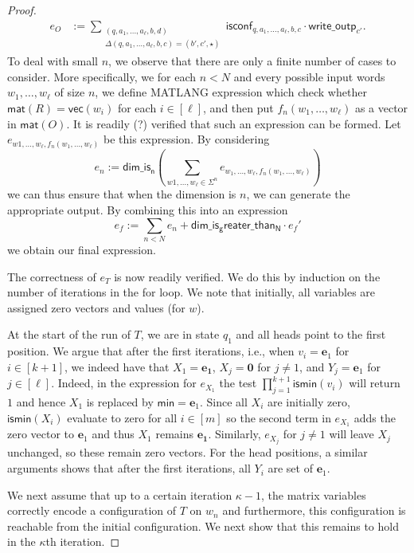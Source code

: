 \begin{proof}
\begin{align*}
	e_{O}&:=\sum_{\substack{(q,a_1,\ldots,a_\ell,b,d)\\
	\Delta(q,a_1,\ldots,a_\ell,b,c)=(b',c',\star)}}\!\!\!\!\!\!\!\!\! \mathsf{isconf}_{q,a_1,\ldots,a_\ell,b,c}\cdot\mathsf{write\_outp}_{c'}.
\end{align*}
To deal with small $n$, we observe that there are only a finite number of cases to
consider. More specifically, we for each $n<N$ and every possible input words
$w_1,\ldots,w_\ell$ of size $n$, we define MATLANG expression which check whether
$\mathsf{mat}(R)=\mathsf{vec}(w_i)$ for each $i\in[\ell]$, and then put $f_n(w_1,\ldots,w_\ell)$ as a vector in $\mathsf{mat}(O)$. It is readily (?) verified
that such an expression can be formed. Let $e_{w1,\ldots,w_\ell,f_n(w_1,\ldots,w_\ell)}$
be this expression. By considering 
$$
e_n:=\mathsf{dim\_is_n}\left(\sum_{w1,\ldots,w_\ell\in\Sigma^n} e_{w_1,\ldots,w_\ell,f_n(w_1,\ldots,w_\ell)}\right)
$$
we can thus ensure that when the dimension is $n$, we can generate the appropriate output.
By combining this into an expression
$$
e_f:=\sum_{n< N} e_n + \mathsf{dim\_is_greater\_than_N}\cdot e_f'
$$
we obtain our final expression.

The correctness of $e_T$ is now readily verified. We do this by induction on the number of iterations in the for loop. We note that initially, all variables are assigned zero vectors and values (for $w$). 

At the start of the run of $T$, we are in state $q_1$ and all heads point to the first position. We argue that after the first 
iterations, i.e., when $v_i=\mathbf{e}_1$ for $i\in[k+1]$, we indeed have that $X_1=\mathbf{e_1}$, $X_j=\mathbf{0}$ for $j\neq 1$, and $Y_j=\mathbf{e}_1$ for $j\in[\ell]$. Indeed, in the expression for $e_{X_1}$ the test $\prod_{j=1}^{k+1} \textsf{ismin}(v_i)$ will return $1$ and hence $X_1$ is replaced by $\mathsf{min}=\mathbf{e}_1$. Since all $X_i$ are initially zero, $\mathsf{ismin}(X_i)$ evaluate to zero for all $i\in[m]$ so the second term in $e_{X_1}$ adds the zero vector to $\mathbf{e}_1$ and thus $X_1$ remains $\mathbf{e_1}$.
Similarly, $e_{X_j}$ for $j\neq 1$ will leave $X_j$ unchanged, so these remain zero vectors. For the head positions, a similar arguments shows that after the first iterations, all $Y_i$ are set of $\mathbf{e}_1$.

We next assume that up to a certain iteration $\kappa-1$, the matrix variables correctly encode a configuration of $T$ on $w_n$ and furthermore, this configuration is reachable from the initial configuration. We next show that this remains to hold in the $\kappa$th iteration.


\end{proof}
